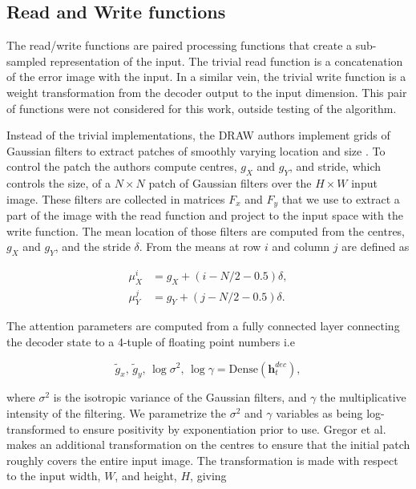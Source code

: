  \subsection{Read and Write functions}

 The read/write functions are paired processing functions that create a sub-sampled representation of the input. The trivial read function is a concatenation of the error image with the input. In a similar vein, the trivial write function is a weight transformation from the decoder output to the input dimension. This pair of functions were not considered for this work, outside testing of the algorithm.  

 Instead of the trivial implementations, the DRAW authors implement grids of Gaussian filters to extract patches of smoothly varying location and size \cite{Gregor2015}. To control the patch the authors compute centres, $g_X$ and $g_Y$, and stride, which controls the size, of a $N \times N$ patch of Gaussian filters over the $H \times W$ input image.  These filters are collected in matrices $F_x$ and $F_y$ that we use to extract a part of the image with the read function and project to the input space with the write function. The mean location of those filters are computed from the centres, $g_X$ and $g_Y$, and the stride $\delta$. From \citet{Gregor2015} the means at row $i$ and column $j$ are defined as 

 \begin{align}
 \mu_X^i &= g_X + (i - N/2-0.5)\delta, \\
 \mu_Y^j &= g_Y + (j - N/2-0.5)\delta.
 \end{align}

\noindent The attention parameters are computed from a fully connected layer connecting the decoder state to a 4-tuple of floating point numbers i.e

\begin{equation}\label{eq:draw_params}
\tilde{g}_x, \,\tilde{g}_y, \, \log \sigma^2, \, \log \gamma = \text{Dense} (\mathbf{h}_t^{dec}),
\end{equation}

\noindent where $\sigma^2$ is the isotropic variance of the Gaussian filters, and $\gamma$ the multiplicative intensity of the filtering. We parametrize the $\sigma^2$ and $\gamma$ variables as being log-transformed to ensure positivity by exponentiation prior to use. Gregor et al. makes an additional transformation on the centres to ensure that the initial patch roughly covers the entire input image. The transformation is made with respect to the input width, $W$, and height, $H$, giving

